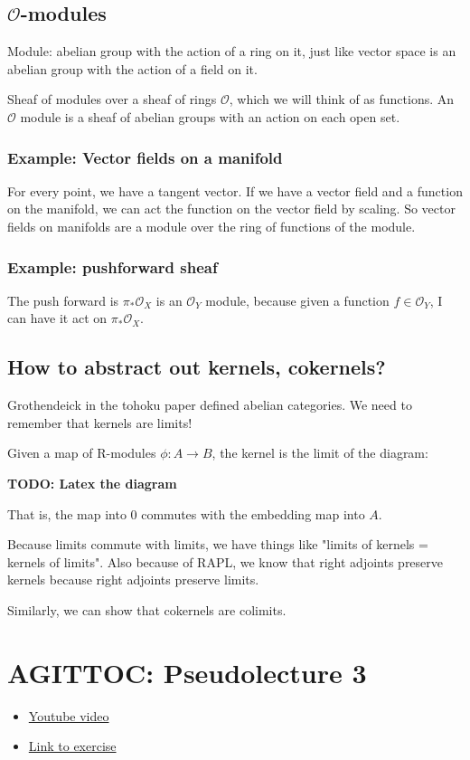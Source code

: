 \documentclass{book}
\renewcommand{\O}{\ensuremath{\mathcal{O}}}
\theoremstyle{definition}
\begin{document}
\section{$\O$-modules}
Module: abelian group with the action of a ring on it, just like vector space
is an abelian group with the action of a field on it.


Sheaf of modules over a sheaf of rings $\O$, which we will think of
as functions. An $\O$ module is a sheaf of abelian groups 
with an action on each open set.

\subsection{Example: Vector fields on a manifold}
For every point, we have a tangent vector. If we have a vector field and a
function on the manifold, we can act the function on the vector field by scaling.
So vector fields on manifolds are a module over the ring of functions of the module.

\subsection{Example: pushforward sheaf}
The push forward is $\pi_* \O_X$ is an $\O_Y$ module, because
given a function $f \in \O_Y$, I can have it act on $\pi_* \O_X$.

\section{How to abstract out kernels, cokernels?}
Grothendeick in the tohoku paper defined abelian categories. We need to remember
that kernels are limits!

Given a map of R-modules $\phi: A \rightarrow B$, the kernel is the limit of
the diagram:


\textbf{TODO: Latex the diagram}

That is, the map into $0$ commutes with the embedding map into $A$. 

Because limits commute with limits, we have things like "limits of kernels = kernels of limits".
Also because of RAPL, we know that right adjoints preserve kernels because
right adjoints preserve limits.

Similarly, we can show that cokernels are colimits.

\chapter{AGITTOC: Pseudolecture 3}
\begin{itemize}
\item \href{https://www.youtube.com/watch?v=E5HnqUHkvGA}{Youtube video}
\item \href{https://math216.wordpress.com/2020/07/13/reading-and-problems-after-the-third-pseudolecture/}{Link to exercise}
\end{itemize}
\end{document}
